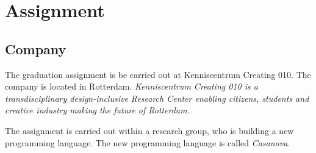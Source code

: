 \chapter{Assignment}
\section{Company}
The graduation assignment is be carried out at Kenniscentrum Creating 010.
The company is located in Rotterdam.
\textit{Kenniscentrum Creating 010 is a transdisciplinary design-inclusive Research Center enabling citizens, students and creative industry making the future of Rotterdam}\cite{creating2016home}.

The assignment is carried out within a research group, who is building a new programming language.
The new programming language is called \emph{Casanova}.







